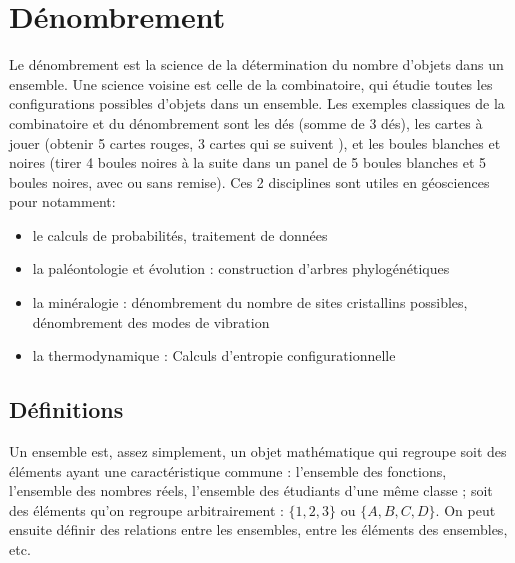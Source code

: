 \chapter{Dénombrement}

Le dénombrement est la science de la détermination du nombre d'objets dans un ensemble. Une science voisine est celle de la combinatoire, qui étudie toutes les configurations possibles d'objets dans un ensemble.
Les exemples classiques de la combinatoire et du dénombrement sont les dés (somme de 3 dés), les cartes à jouer (obtenir 5 cartes rouges, 3 cartes qui se suivent ), et les boules blanches et noires (tirer 4 boules noires à la suite dans un panel de 5 boules blanches et 5 boules noires, avec ou sans remise). Ces 2 disciplines sont utiles en géosciences pour notamment:

\begin{itemize}
   \item  le calculs de probabilités, traitement de données
   \item  la paléontologie et évolution : construction d'arbres phylogénétiques
   \item  la minéralogie : dénombrement du nombre de sites cristallins possibles, dénombrement des modes de vibration
   \item  la thermodynamique : Calculs d'entropie configurationnelle
\end{itemize}


\section{Définitions}

Un ensemble est, assez simplement, un objet mathématique qui regroupe soit des éléments ayant une caractéristique commune : l'ensemble des fonctions, l'ensemble des nombres réels, l'ensemble des étudiants d'une même classe ; soit des éléments qu'on regroupe arbitrairement : \(\{1,2,3\}\) ou \(\{A, B, C, D\}\). On peut ensuite définir des relations entre les ensembles, entre les éléments des ensembles, etc.\\

